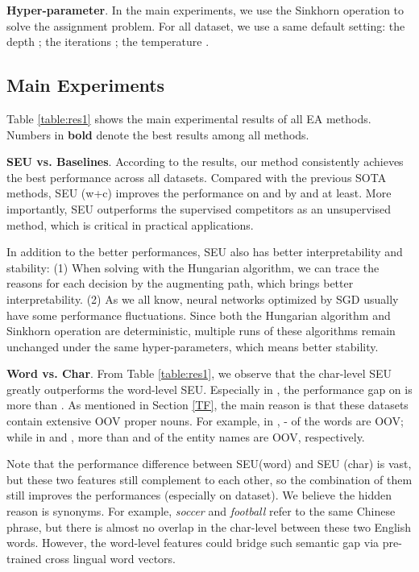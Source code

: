 \documentclass[11pt]{article}
\begin{document}
\noindent
\textbf{Hyper-parameter}.
In the main experiments, we use the Sinkhorn operation to solve the assignment problem.
For all dataset, we use a same default setting:
the depth ;
the iterations ;
the temperature .

\subsection{Main Experiments}
Table \ref{table:res1} shows the main experimental results of all EA methods.
Numbers in \textbf{bold} denote the best results among all methods.

\textbf{SEU vs. Baselines}.
According to the results, our method consistently achieves the best performance across all datasets.
Compared with the previous SOTA methods, SEU (w+c) improves the performance on  and  by  and  at least.
More importantly, SEU outperforms the supervised competitors as an unsupervised method, which is critical in practical applications.

In addition to the better performances, SEU also has better interpretability and stability:
(1) When solving with the Hungarian algorithm, we can trace the reasons for each decision by the augmenting path, which brings better interpretability.
(2) As we all know, neural networks optimized by SGD usually have some performance fluctuations.
Since both the Hungarian algorithm and Sinkhorn operation are deterministic, multiple runs of these algorithms remain unchanged under the same hyper-parameters, which means better stability.

\textbf{Word vs. Char}.
From Table \ref{table:res1}, we observe that the char-level SEU greatly outperforms the word-level SEU.
Especially in , the performance gap on  is more than .
As mentioned in Section \ref{TF}, the main reason is that these datasets contain extensive OOV proper nouns.
For example, in , - of the words are OOV;
while in  and , more than  and  of the entity names are OOV, respectively.

Note that the performance difference between SEU(word) and SEU (char) is vast, but these two features still complement to each other, so the combination of them still improves the performances (especially on  dataset).
We believe the hidden reason is synonyms.
For example, \emph{soccer} and \emph{football} refer to the same Chinese phrase, but there is almost no overlap in the char-level between these two English words.
However, the word-level features could bridge such semantic gap via pre-trained cross lingual word vectors.
\end{document}
